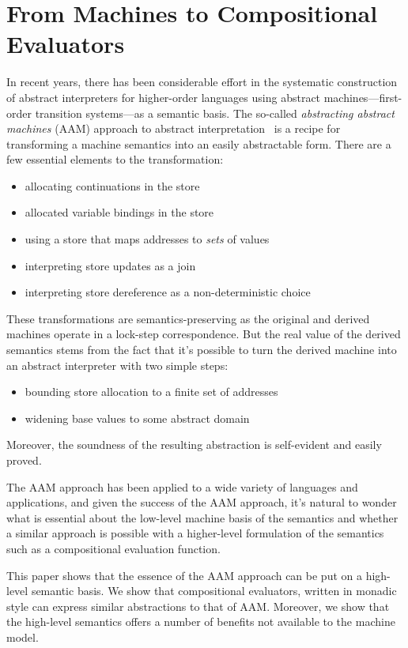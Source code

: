 \section{From Machines to Compositional Evaluators}

In recent years, there has been considerable effort in the systematic
construction of abstract interpreters for higher-order languages using abstract
machines---first-order transition systems---as a semantic basis.  The so-called
\emph{abstracting abstract machines} (AAM) approach to abstract
interpretation~\cite{dvanhorn:VanHorn2010Abstracting} is a recipe for
transforming a machine semantics into an easily abstractable form. There are a
few essential elements to the transformation:

\begin{itemize}
\item allocating continuations in the store
\item allocated variable bindings in the store
\item using a store that maps addresses to \emph{sets} of values
\item interpreting store updates as a join
\item interpreting store dereference as a non-deterministic choice
\end{itemize}

These transformations are semantics-preserving as the original and derived
machines operate in a lock-step correspondence.  But the real value of the
derived semantics stems from the fact that it's possible to turn the derived
machine into an abstract interpreter with two simple steps:

\begin{itemize}
\item bounding store allocation to a finite set of addresses
\item widening base values to some abstract domain
\end{itemize}

Moreover, the soundness of the resulting abstraction is self-evident and easily
proved.

The AAM approach has been applied to a wide variety of languages and
applications, and given the success of the AAM approach, it's natural to wonder
what is essential about the low-level machine basis of the semantics and
whether a similar approach is possible with a higher-level formulation of the
semantics such as a compositional evaluation function.

This paper shows that the essence of the AAM approach can be put on a
high-level semantic basis.  We show that compositional evaluators, written in
monadic style can express similar abstractions to that of AAM.  Moreover, we
show that the high-level semantics offers a number of benefits not available to
the machine model.  

